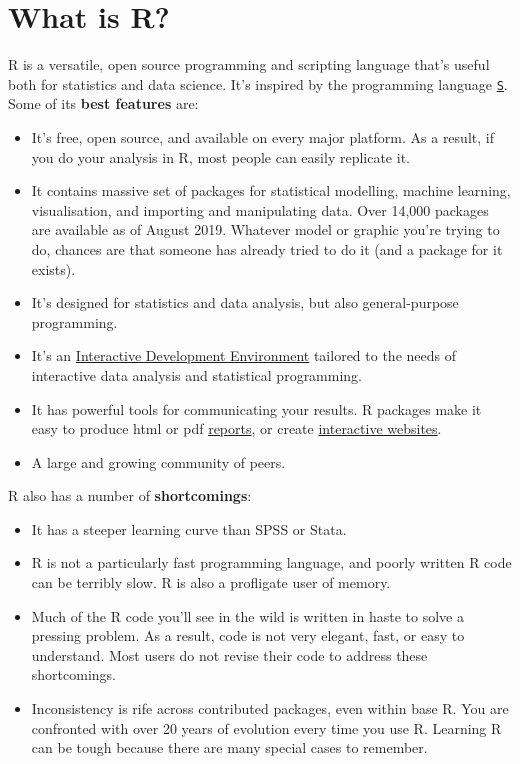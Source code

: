 \documentclass[]{book}
\begin{document}
\hypertarget{what-is-r}{%
\section{What is R?}\label{what-is-r}}

R is a versatile, open source programming and scripting language that's useful both for statistics and data science. It's inspired by the programming language \href{https://en.wikipedia.org/wiki/S_(programming_language)}{\texttt{S}}. Some of its \textbf{best features} are:

\begin{itemize}
\item
  It's free, open source, and available on every major platform. As a result, if you do your analysis in R, most people can easily replicate it.
\item
  It contains massive set of packages for statistical modelling, machine learning, visualisation, and importing and manipulating data. Over 14,000 packages are available as of August 2019. Whatever model or graphic you're trying to do, chances are that someone has already tried to do it (and a package for it exists).
\item
  It's designed for statistics and data analysis, but also general-purpose programming.
\item
  It's an \href{http://www.rstudio.com/ide/}{Interactive Development Environment} tailored to the needs of interactive data analysis and statistical programming.
\item
  It has powerful tools for communicating your results. R packages make it easy to produce html or pdf \href{http://yihui.name/knitr/}{reports}, or create \href{http://www.rstudio.com/shiny/}{interactive websites}.
\item
  A large and growing community of peers.
\end{itemize}

R also has a number of \textbf{shortcomings}:

\begin{itemize}
\item
  It has a steeper learning curve than SPSS or Stata.
\item
  R is not a particularly fast programming language, and poorly written R code can be terribly slow. R is also a profligate user of memory.
\item
  Much of the R code you'll see in the wild is written in haste to solve a pressing problem. As a result, code is not very elegant, fast, or easy to understand. Most users do not revise their code to address these shortcomings.
\item
  Inconsistency is rife across contributed packages, even within base R. You are confronted with over 20 years of evolution every time you use R. Learning R can be tough because there are many special cases to remember.
\end{itemize}
\end{document}
